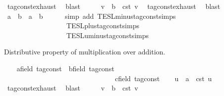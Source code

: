 \begin{isabellebody}
\ tag{\isacharunderscore}const{\isachardot}exhaust\ \isamarkupfalse%
\ blast\isanewline
\ \ \isamarkupfalse%
\ \isamarkupfalse%
\ v\ \ {\isacartoucheopen}b\ {\isacharequal}\ {\isasymtau}\isactrlsub c\isactrlsub s\isactrlsub t\ v{\isacartoucheclose}\ \isamarkupfalse%
\ tag{\isacharunderscore}const{\isachardot}exhaust\ \isamarkupfalse%
\ blast\isanewline
\ \ \isamarkupfalse%
\ \isamarkupfalse%
\ {\isacartoucheopen}a\ {\isacharminus}\ b\ {\isacharequal}\ a\ {\isacharplus}\ {\isacharminus}b{\isacartoucheclose}\isanewline
\ \ \ \ \isamarkupfalse%
\ {\isacharparenleft}simp\ add{\isacharcolon}\ TESL{\isachardot}minus{\isacharunderscore}tag{\isacharunderscore}const{\isachardot}simps\isanewline
\ \ \ \ \ \ \ \ \ \ \ \ \ \ \ \ \ \ TESL{\isachardot}plus{\isacharunderscore}tag{\isacharunderscore}const{\isachardot}simps\isanewline
\ \ \ \ \ \ \ \ \ \ \ \ \ \ \ \ \ \ TESL{\isachardot}uminus{\isacharunderscore}tag{\isacharunderscore}const{\isachardot}simps{\isacharparenright}\isanewline
{}\isamarkupfalse%
%
\begin{isamarkuptext}%
Distributive property of multiplication over addition.%
\end{isamarkuptext}\isamarkuptrue%
\ \ \isamarkupfalse%
\ a{\isacharcolon}{\isacharcolon}{\isacartoucheopen}{\isacharprime}{\isasymtau}{\isacharcolon}{\isacharcolon}field\ tag{\isacharunderscore}const{\isacartoucheclose}\ \ b{\isacharcolon}{\isacharcolon}{\isacartoucheopen}{\isacharprime}{\isasymtau}{\isacharcolon}{\isacharcolon}field\ tag{\isacharunderscore}const{\isacartoucheclose}\isanewline
\ \ \ \ \ \ \ \ \ \ \ \ \ \ \ \ \ \ \ \ \ \ \ \ \ \ \ \ \ \ \ \ c{\isacharcolon}{\isacharcolon}{\isacartoucheopen}{\isacharprime}{\isasymtau}{\isacharcolon}{\isacharcolon}field\ tag{\isacharunderscore}const{\isacartoucheclose}\isanewline
\ \ \isamarkupfalse%
\ u\ \ {\isacartoucheopen}a\ {\isacharequal}\ {\isasymtau}\isactrlsub c\isactrlsub s\isactrlsub t\ u{\isacartoucheclose}\ \isamarkupfalse%
\ tag{\isacharunderscore}const{\isachardot}exhaust\ \isamarkupfalse%
\ blast\isanewline
\ \ \isamarkupfalse%
\ \isamarkupfalse%
\ v\ \ {\isacartoucheopen}b\ {\isacharequal}\ {\isasymtau}\isactrlsub c\isactrlsub s\isactrlsub t\ v{\isacartoucheclose}\ \isamarkupfalse%

\end{isabellebody}
